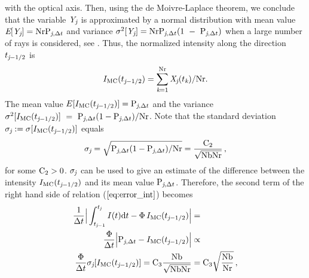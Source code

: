 with the optical axis. Then, using the de Moivre-Laplace theorem, we conclude that the variable $\textit{Y}_{\textit{j}}$ is approximated by a normal distribution with mean value
$\textit{E}[\textit{Y}_{\textit{j}}] = \textrm{Nr}\textrm{P}_{\textit{j}, \Delta t}$ and variance $\sigma^2[\textit{Y}_{\textit{j}}] = \textrm{Nr}\textrm{P}_{\textit{j}, \Delta t}(1~-~\textrm{P}_{\textit{j}, \Delta t})$
when a large number of rays is considered, see \cite{zolotarev1997modern, rubinstein2016simulation}.
Thus, the normalized intensity along the direction $t_{\textit{j}-1/2}$ is
\begin{equation}I_{\textrm{MC}}(t_{\textit{j}-1/2}) = \sum_{\textit{k}=1}^{\textrm{Nr}}\textit{X}_{\textit{j}}(t_{\textit{k}})/\textrm{Nr}.\end{equation}
The mean value $E[I_{\textrm{MC}}(t_{\textit{j}-1/2})]=\textrm{P}_{\textit{j}, \Delta t}$
and the variance $\sigma^2[I_{\textrm{MC}}(t_{\textit{j}-1/2})] ~=~ \textrm{P}_{\textit{j}, \Delta t}(1-\textrm{P}_{\textit{j}, \Delta t})/\textrm{Nr}$.
Note that the standard deviation $\sigma_{\textit{j}}:=\sigma[I_{\textrm{MC}}(t_{\textit{j}-1/2})]$ equals
\begin{equation}\label{sigma}
\sigma_{\textit{j}}= \sqrt{\textrm{P}_{\textit{j}, \Delta t}(1-\textrm{P}_{\textit{j}, \Delta t})/\textrm{Nr}}= \frac{\textrm{C}_2}{\sqrt{\textrm{Nb}\textrm{Nr}}}\,, \end{equation}
 for some $\textrm{C}_{2}>0$. $\sigma_{\textit{j}}$ can be used to give an estimate of the difference between the intensity $I_{\textrm{MC}}(t_{\textit{j}-1/2})$ and its mean value $\textrm{P}_{\textit{j}, \Delta t}$.
Therefore, the second term of the right hand side of relation ($\ref{eq:error_int}$) becomes
\begin{equation}\begin{aligned}
\frac{1}{\Delta t}\Big|\int_{t_{\textit{j}-1}}^{t_{\textit{j}}} I(t)\textrm{d}t -
\Phi\, I_{\textrm{MC}}(t_{\textit{j}-1/2})\Big| &=  \\
\frac{\Phi}{\Delta t}\Big|\textrm{P}_{\textit{j}, \Delta t} -I_{\textrm{MC}}(t_{\textit{j}-1/2})\Big| &\propto  \\
  \frac{\Phi}{\Delta t}
\sigma_{\textit{j}}[I_{\textrm{MC}}(t_{\textit{j}-1/2})]=\textrm{C}_3\frac{\textrm{Nb}}{\sqrt{\textrm{Nb}\textrm{Nr}}} & = \textrm{C}_3\sqrt{\frac{\textrm{Nb}}{\textrm{Nr}}}\,,
\end{aligned}
\end{equation}
